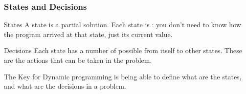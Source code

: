 \documentclass{beamer}
\begin{document}
\begin{frame}
  \frametitle{States and Decisions}
  \begin{block}{States}
    A state is a partial solution. Each state is
    : you don't need to know how the program
    arrived at that state, just its current value.
  \end{block}
  \begin{block}{Decisions}
    Each state has a number of possible  from
    itself to other states. These are the actions that can be taken in
    the problem.
  \end{block}
  \medskip
  The Key for Dynamic programming is being able to define what are the
  states, and what are the decisions in a problem.
\end{frame}
\end{document}
